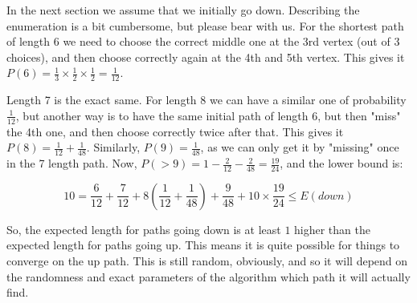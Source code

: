 \documentclass{scrartcl}
\begin{document}
In the next section we assume that we initially go down. Describing the
enumeration is a bit cumbersome, but please bear with us. For the shortest
path of length 6 we need to choose the correct middle one at the 3rd
vertex (out of 3 choices), and then choose correctly again at the 4th and
5th vertex. This gives it $P(6) = \frac{1}{3} \times \frac{1}{2} \times
\frac{1}{2} = \frac{1}{12}$.

Length 7 is the exact same. For length 8 we can have a similar one of
probability $\frac{1}{12}$, but another way is to have the same initial
path of length 6, but then "miss" the 4th one, and then choose
correctly twice after that. This gives it $P(8) = \frac{1}{12} +
\frac{1}{48}$. Similarly, $P(9) = \frac{1}{48}$, as we can only get it by
"missing" once in the 7 length path. Now, $P(>9) = 1 - \frac{2}{12} -
\frac{2}{48} = \frac{19}{24}$, and the lower bound is:

\begin{equation}
  10 = \frac{6}{12} + \frac{7}{12} + 8(\frac{1}{12} + \frac{1}{48}) +
  \frac{9}{48} + 10 \times \frac{19}{24} \le E(down)
\end{equation}

So, the expected length for paths going down is at least $1$ higher
than the expected length for paths going up. This means it is quite
possible for things to converge on the up path. This is still random,
obviously, and so it will depend on the randomness and exact parameters of
the algorithm which path it will actually find.
\end{document}
